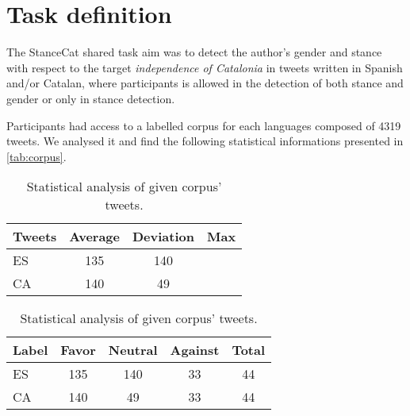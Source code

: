 \section{Task definition} \label{sec:task}

The StanceCat shared task aim was to detect the author's gender and stance with respect to the target \emph{independence of Catalonia} in tweets written in Spanish and/or Catalan, where participants is allowed in the detection of both stance and gender or only in stance detection.

Participants had access to a labelled corpus for each languages composed of 4319 tweets. We analysed it and find the following statistical informations presented in \cref{tab:corpus}.

\begin{table}[h]
\footnotesize
\centering
\begin{tabular}{lccc}
\toprule
\hline
Tweets		& Average		& Deviation		& Max		\\
\hline
ES			& 135			& 140			&			\\ 
CA			& 140			& 49			&			\\ 
\hline
\bottomrule
\end{tabular}
\caption{Statistical analysis of given corpus' tweets.}
\label{tab:tweet}
\end{table}


\begin{table}[h]
\footnotesize
\centering
\begin{tabular}{|l|c|c|c|c|}
\toprule
\hline
Label		& Favor		& Neutral		& Against	& Total		\\
\hline
ES			& 135		& 140			& 33		& 44		\\
CA			& 140		& 49			& 33		& 44		\\
\hline
\bottomrule
\end{tabular}
\caption{Statistical analysis of given corpus' tweets.}
\label{tab:label}
\end{table}
